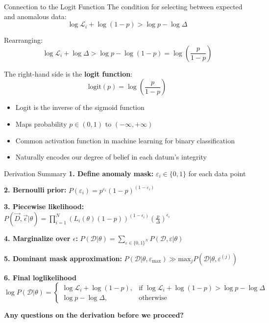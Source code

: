\documentclass[aspectratio=169]{beamer}
\begin{document}
\begin{frame}{Connection to the Logit Function}
  \footnotesize
  The condition for selecting between expected and anomalous data:
  \begin{equation}
    \log \mathcal{L}_i + \log(1-p) > \log p - \log \Delta
  \end{equation}
  
  Rearranging:
  \begin{equation}
    \log \mathcal{L}_i + \log \Delta > \log p - \log(1-p) = \log\left(\frac{p}{1-p}\right)
  \end{equation}
  
  The right-hand side is the \textbf{logit function}:
  \begin{equation}
    \text{logit}(p) = \log\left(\frac{p}{1-p}\right)
  \end{equation}
  
  \begin{itemize}
    \item Logit is the inverse of the sigmoid function
    \item Maps probability $p \in (0,1)$ to $(-\infty, +\infty)$
    \item Common activation function in machine learning for binary classification
    \item Naturally encodes our degree of belief in each datum's integrity
  \end{itemize}
\end{frame}

\begin{frame}{Derivation Summary}
  \footnotesize
  \textbf{1. Define anomaly mask:} $\varepsilon_i \in \{0, 1\}$ for each data point
  
  \textbf{2. Bernoulli prior:} $P(\varepsilon_i) = p^{\varepsilon_i}(1-p)^{(1-\varepsilon_i)}$
  
  \textbf{3. Piecewise likelihood:} $P(\vec{D}, \vec{\epsilon} | \theta) = \prod_{i=1}^{N} \left(L_i(\theta) (1-p)\right)^{(1-\epsilon_i)} \left(\frac{p}{\Delta}\right)^{\epsilon_i}$
  
  \textbf{4. Marginalize over $\epsilon$:} $P(\mathcal{D} | \theta) = \sum_{\varepsilon \in \{ 0, 1 \} ^N}P(\mathcal{D},\varepsilon|\theta)$
  
  \textbf{5. Dominant mask approximation:} $P(\mathcal{D}|\theta, \varepsilon_{\mathrm{max}}) \gg \mathrm{max}_j P(\mathcal{D}|\theta,\varepsilon^{(j)})$
  
  \textbf{6. Final loglikelihood}
  \begin{equation*}
  \log P(\mathcal{D}|\theta) =
  \begin{cases}
  \log \mathcal{L}_i + \log(1 - p), & \text{if } \log \mathcal{L}_i + \log(1 - p) > \log p - \log \Delta \\
  \log p - \log \Delta, & \text{otherwise}
  \end{cases}
  \end{equation*}
  
  \vfill
  \centering
  \textbf{Any questions on the derivation before we proceed?}
\end{frame}
\end{document}
